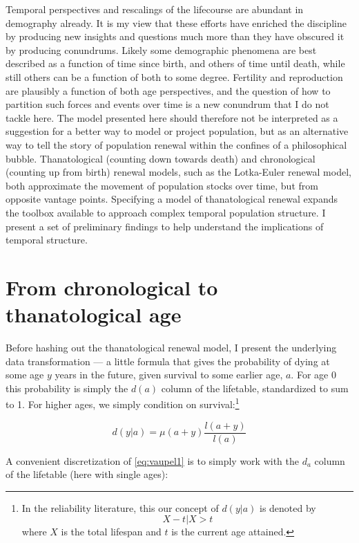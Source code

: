 \documentclass{article}
\begin{document}
Temporal perspectives and rescalings of the lifecourse are abundant in
demography already. It is my view that these efforts have enriched the
discipline by producing new insights and questions much more than they have obscured it by
producing conundrums. Likely some demographic phenomena are best
described as a function of time since birth, and others of time until death,
while still others can be a function of both to some degree. Fertility and
reproduction are plausibly a function of both age perspectives, and the question
of how to partition such forces and events over time is a new conundrum that I
do not tackle here. The model presented here should therefore not be interpreted
as a suggestion for a better way to model or project population, but as an alternative way to tell the
story of population renewal within the confines of a philosophical bubble.
Thanatological (counting down towards death) and chronological (counting up
from birth) renewal models, such as the Lotka-Euler renewal model, both
approximate the movement of population stocks over time, but from opposite
vantage points. Specifying a model of thanatological renewal expands the toolbox
available to approach complex temporal population structure. I present a set of
preliminary findings to help understand the implications of temporal structure.

\section*{From chronological to thanatological age}

Before hashing out the thanatological renewal model, I present the
underlying data transformation --- a little formula that
gives the probability of dying at some age $y$ years in the future, given
survival to some earlier age, $a$. For age 0 this probability is simply the $d(a)$ column of the
lifetable, standardized to sum to 1. For higher ages, we simply condition on survival:\footnote{In the reliability literature, this
our concept of $d(y|a)$ is denoted by \begin{equation}
X - t | X > t
\end{equation}
where $X$ is the total lifespan and $t$ is the current age attained.}

\begin{equation}
\label{eq:vaupel1}
d(y | a) = \mu(a+y)\frac{l(a+y)}{l(a)}
\end{equation}

A convenient discretization of \eqref{eq:vaupel1} is to simply work with the
$d_a$ column of the lifetable (here with single ages):
\end{document}

